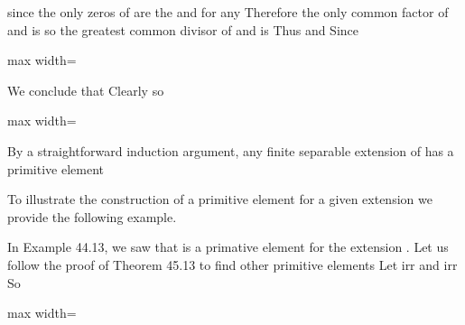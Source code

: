 \documentclass[11pt,oneside]{article}
\begin{document}
\begin{BookBody}
\noindent since the only zeros of  are the  and  for any  Therefore the only common factor of  and  is  so the greatest common divisor of  and  is  Thus  and  Since 

\begin{center}\begin{adjustbox}{max width=\linewidth}\end{adjustbox}\end{center}

\noindent We conclude that  Clearly  so

\begin{center}\begin{adjustbox}{max width=\linewidth}\end{adjustbox}\end{center}

\noindent By a straightforward induction argument, any finite separable extension of  has a primitive element\BookEnd{\blacklozenge}

To illustrate the construction of a primitive element for a given extension we provide the following example.

 In Example 44.13, we saw that  is a primative element for the extension . Let us follow the proof of Theorem 45.13 to find other primitive elements  Let  irr and  irr So

\begin{center}\begin{adjustbox}{max width=\linewidth}\end{adjustbox}\end{center}

\end{BookBody}
\end{document}
